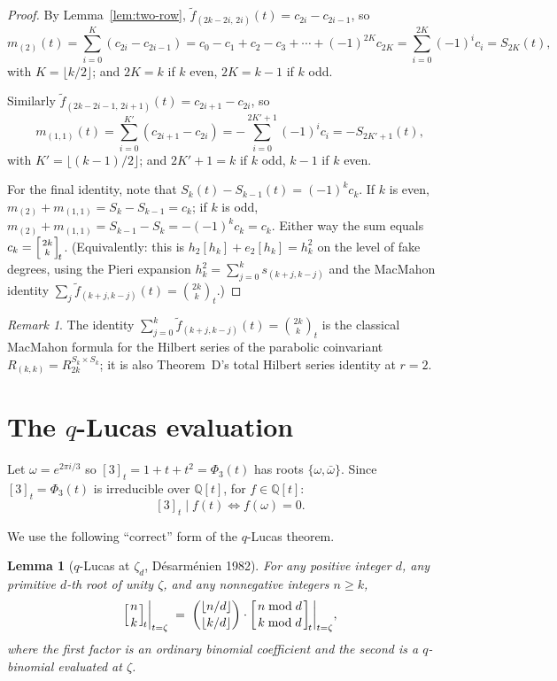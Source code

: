 \documentclass[11pt]{article}
\newtheorem{lemma}[theorem]{Lemma}
\theoremstyle{definition}
\theoremstyle{remark}
\newtheorem*{remark}{Remark}
\newcommand{\fdeg}{\widetilde{f}}
\newcommand{\qbinom}[2]{\left[{#1 \atop #2}\right]_{\!t}}
\begin{document}
\begin{proof}
By Lemma~\ref{lem:two-row}, $\fdeg_{(2k-2i,\,2i)}(t) = c_{2i} - c_{2i-1}$, so
\[
m_{(2)}(t) = \sum_{i=0}^{K}(c_{2i} - c_{2i-1})
= c_0 - c_1 + c_2 - c_3 + \cdots + (-1)^{2K} c_{2K}
= \sum_{i=0}^{2K}(-1)^i c_i
= S_{2K}(t),
\]
with $K = \lfloor k/2 \rfloor$; and $2K = k$ if $k$ even, $2K = k-1$ if $k$ odd.

Similarly $\fdeg_{(2k-2i-1,\,2i+1)}(t) = c_{2i+1} - c_{2i}$, so
\[
m_{(1,1)}(t) = \sum_{i=0}^{K'} (c_{2i+1} - c_{2i})
= -\sum_{i=0}^{2K'+1}(-1)^i c_i
= -S_{2K'+1}(t),
\]
with $K' = \lfloor (k-1)/2 \rfloor$; and $2K' + 1 = k$ if $k$ odd, $k-1$ if $k$ even.

For the final identity, note that $S_k(t) - S_{k-1}(t) = (-1)^k c_k$.
If $k$ is even, $m_{(2)} + m_{(1,1)} = S_k - S_{k-1} = c_k$; if $k$ is odd,
$m_{(2)} + m_{(1,1)} = S_{k-1} - S_k = -(-1)^k c_k = c_k$. Either way the
sum equals $c_k = \qbinom{2k}{k}$. (Equivalently: this is
$h_2[h_k] + e_2[h_k] = h_k^2$ on the level of fake degrees, using the
Pieri expansion $h_k^2 = \sum_{j=0}^k s_{(k+j, k-j)}$ and the MacMahon
identity $\sum_j \fdeg_{(k+j, k-j)}(t) = \binom{2k}{k}_t$.)
\end{proof}

\begin{remark}
The identity $\sum_{j=0}^{k} \fdeg_{(k+j, k-j)}(t) = \binom{2k}{k}_t$
is the classical MacMahon formula for the Hilbert series of the parabolic
coinvariant $R_{(k, k)} = R_{2k}^{S_k \times S_k}$; it is also
Theorem~D's total Hilbert series identity at $r = 2$.
\end{remark}

\section{The $q$-Lucas evaluation}

Let $\omega = e^{2\pi i/3}$ so $[3]_t = 1 + t + t^2 = \Phi_3(t)$ has roots
$\{\omega, \bar\omega\}$. Since $[3]_t = \Phi_3(t)$ is irreducible over
$\mathbb{Q}[t]$, for $f \in \mathbb{Q}[t]$:
\[
[3]_t \mid f(t) \iff f(\omega) = 0.
\]

We use the following ``correct'' form of the $q$-Lucas theorem.

\begin{lemma}[$q$-Lucas at $\zeta_d$, Désarménien 1982]\label{lem:qlucas}
For any positive integer $d$, any primitive $d$-th root of unity $\zeta$,
and any nonnegative integers $n \ge k$,
\[
\qbinom{n}{k}\!\bigg|_{t = \zeta} \;=\;
\binom{\lfloor n/d \rfloor}{\lfloor k/d \rfloor} \cdot
\qbinom{n \bmod d}{k \bmod d}\!\bigg|_{t = \zeta},
\]
where the first factor is an \emph{ordinary} binomial coefficient and the
second is a $q$-binomial \emph{evaluated at $\zeta$}.
\end{lemma}
\end{document}
